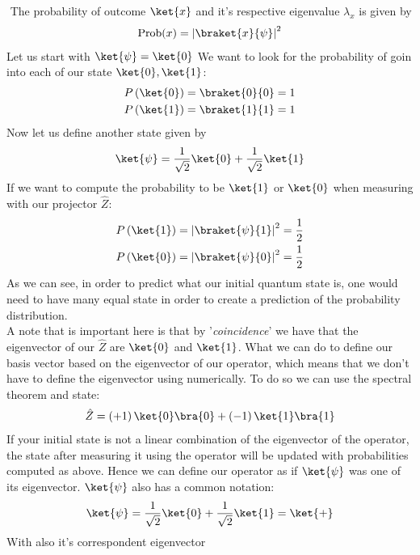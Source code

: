\begin{parag}{$ $}
	The probability of outcome $\ket{x}$ and it's respective eigenvalue $\lambda_x$ is given by
	\begin{align*} 
		\text{Prob}(x) = \left|\braket{x}{\psi}\right|^2
	\end{align*}
	Let us start with $\ket{\psi} = \ket{0}$ We want to look for the probability of goin into each of our state $\ket{0}, \ket{1}$:
	\begin{align*} 
		P\left(\ket{0}\right) = \braket{0}{0} = 1\\
		P\left(\ket{1}\right) = \braket{1}{1} = 1
	\end{align*}
	Now let us define another state given by 
	\begin{align*} 
		\ket{\psi} = \frac{1}{\sqrt{2}}  \ket{0} + \frac{1}{\sqrt{2}} \ket{1}
	\end{align*}
	If we want to compute the probability to be $\ket{1}$ or $\ket{0}$ when measuring with our projector $\hat{Z}$:
	\begin{align*} 
		P\left(\ket{1}\right)  = \left|\braket{\psi}{1}\right|^2 = \frac{1}{2}\\
		P\left(\ket{0}\right)  = \left|\braket{\psi}{0}\right|^2 = \frac{1}{2}
	\end{align*}
	As we can see, in order to predict what our initial quantum state is, one would need to have many equal state in order to create a prediction of the probability distribution.\\
	A note that is important here is that by '\textit{coincidence}' we have that the eigenvector of our $\hat{Z}$ are $\ket{0}$ and $\ket{1}$. What we can do to define our basis vector based on the eigenvector of our operator, which means that we don't have to define the eigenvector using numerically. To do so we can use the spectral theorem and state:
	\begin{align*} 
		\hat{Z}  = \left(+1\right) \ket{0}\bra{0} +  \left(-1\right)\ket{1}\bra{1}
	\end{align*}
	If your initial state is not a linear combination of the eigenvector of the operator, the state after measuring it using the operator will be updated with probabilities computed as above.
    Hence we can define our operator as if $\ket{\psi}$ was one of its eigenvector. $\ket{\psi}$ also has a common notation:
	\begin{align*} 
		 \ket{\psi} =  \frac{1}{\sqrt{2}} \ket{0} + \frac{1}{\sqrt{2}} \ket{1} = \ket{+}
	\end{align*}
	With also it's correspondent eigenvector

\end{parag}
